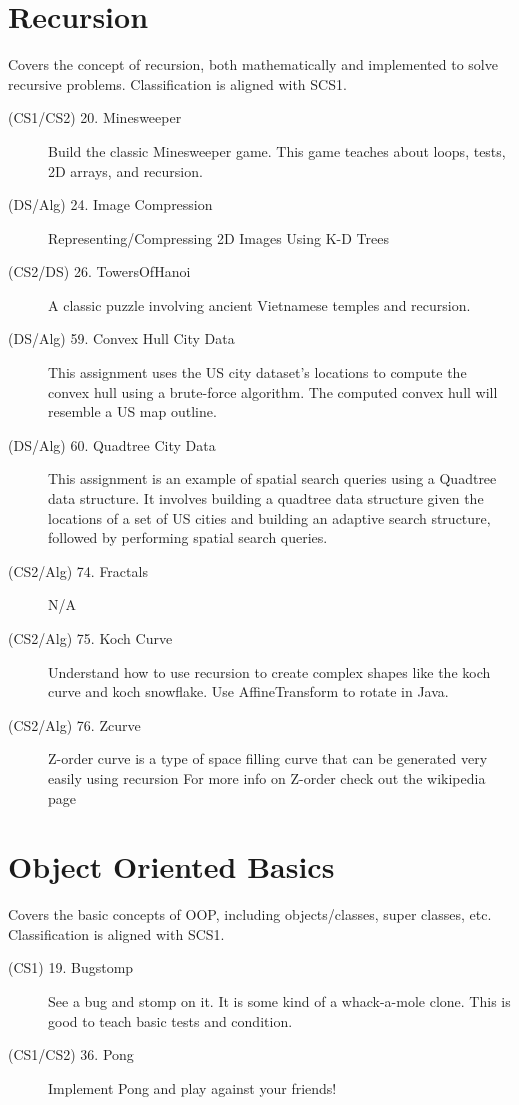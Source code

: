 \documentclass[10pt, onecoulmn]{article}
\begin{document}
\section{Recursion}
Covers the concept of recursion, both mathematically and implemented to solve recursive problems. Classification is aligned with SCS1.
\begin{description}
	\item[(CS1/CS2) 20. Minesweeper] Build the classic Minesweeper game. This game teaches about loops, tests, 2D arrays, and recursion.
	\item[(DS/Alg) 24. Image Compression] Representing/Compressing 2D Images Using K-D Trees
	\item[(CS2/DS) 26. TowersOfHanoi] A classic puzzle involving ancient Vietnamese temples and recursion.
	\item[(DS/Alg) 59. Convex Hull City Data] This assignment uses the US city dataset's locations to compute the convex hull using a brute-force algorithm. The computed convex hull will resemble a US map outline.
	\item[(DS/Alg) 60. Quadtree City Data] This assignment is an example of spatial search queries using a Quadtree data structure. It involves building a quadtree data structure given the locations of a set of US cities and building an adaptive search structure, followed by performing spatial search queries.
	\item[(CS2/Alg) 74. Fractals] N/A
	\item[(CS2/Alg) 75. Koch Curve] Understand how to use recursion to create complex shapes like the koch curve and koch snowflake. Use AffineTransform to rotate in Java.
	\item[(CS2/Alg) 76. Zcurve] Z-order curve is a type of space filling curve that can be generated very easily using recursion For more info on Z-order check out the wikipedia page
\end{description}
\section{Object Oriented Basics}
Covers the basic concepts of OOP, including objects/classes, super classes, etc. Classification is aligned with SCS1.
\begin{description}
	\item[(CS1) 19. Bugstomp] See a bug and stomp on it. It is some kind of a whack-a-mole clone. This is good to teach basic tests and condition.
	\item[(CS1/CS2) 36. Pong] Implement Pong and play against your friends!
\end{description}
\end{document}
